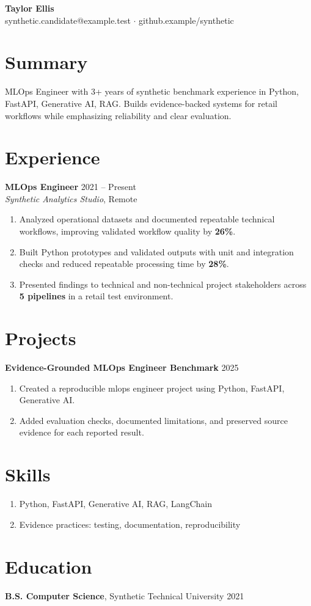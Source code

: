 \documentclass[10pt,letterpaper]{article}
\begin{document}
\begin{center}
{\Large \textbf{Taylor Ellis}}\\
synthetic.candidate@example.test $\cdot$ github.example/synthetic
\end{center}

\section*{Summary}
MLOps Engineer with 3+ years of synthetic benchmark experience in Python, FastAPI, Generative AI, RAG. Builds evidence-backed systems for retail workflows while emphasizing reliability and clear evaluation.

\section*{Experience}
\textbf{MLOps Engineer} \hfill 2021 -- Present\\
\textit{Synthetic Analytics Studio}, Remote
\begin{enumerate}
  \item Analyzed operational datasets and documented repeatable technical workflows, improving validated workflow quality by \textbf{26\%}.
  \item Built Python prototypes and validated outputs with unit and integration checks and reduced repeatable processing time by \textbf{28\%}.
  \item Presented findings to technical and non-technical project stakeholders across \textbf{5 pipelines} in a retail test environment.
\end{enumerate}

\section*{Projects}
\textbf{Evidence-Grounded MLOps Engineer Benchmark} \hfill 2025
\begin{enumerate}
  \item Created a reproducible mlops engineer project using Python, FastAPI, Generative AI.
  \item Added evaluation checks, documented limitations, and preserved source evidence for each reported result.
\end{enumerate}

\section*{Skills}
\begin{enumerate}
  \item Python, FastAPI, Generative AI, RAG, LangChain
  \item Evidence practices: testing, documentation, reproducibility
\end{enumerate}

\section*{Education}
\textbf{B.S. Computer Science}, Synthetic Technical University \hfill 2021
\end{document}
